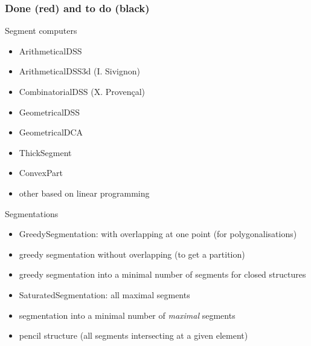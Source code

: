 \begin{frame}
  \frametitle{Done (red) and to do (black)}
 

\begin{block}{Segment computers}
\begin{itemize}
  \item \alert{ArithmeticalDSS}
  \item \alert{ArithmeticalDSS3d} (I. Sivignon)
  \item \alert{CombinatorialDSS} (X. Proven\c{c}al)
  \item \alert{GeometricalDSS}
  \item \alert{GeometricalDCA}
  \item ThickSegment
  \item ConvexPart
  \item other based on linear programming
\end{itemize}
\end{block}

\begin{block}{Segmentations}
\begin{itemize}
  \item \alert{GreedySegmentation}: with overlapping at one point (for polygonalisations)
  \item greedy segmentation without overlapping (to get a partition)
  \item greedy segmentation into a minimal number of segments for closed structures 
  \item \alert{SaturatedSegmentation}: all maximal segments
  \item segmentation into a minimal number of \emph{maximal} segments
  \item pencil structure (all segments intersecting at a given element)
\end{itemize}
\end{block}

\end{frame}

